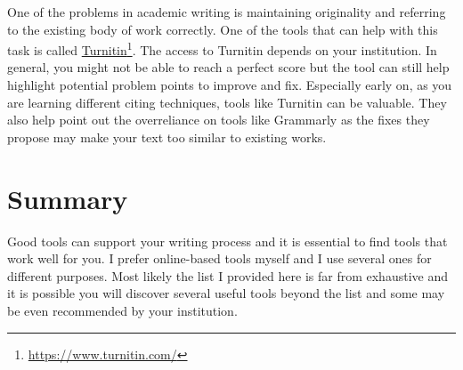 One of the problems in academic writing is maintaining originality and referring to the existing body of work correctly.
One of the tools that can help with this task is called \href{https://www.turnitin.com/}{Turnitin}\footnote{\url{https://www.turnitin.com/}}.
The access to Turnitin depends on your institution. In general, you might not be able to reach a perfect score but the tool can still help highlight potential problem points to improve and fix.
Especially early on, as you are learning different citing techniques, tools like Turnitin can be valuable.
They also help point out the overreliance on tools like Grammarly as the fixes they propose may make your text too similar to existing works.


\section{Summary}

Good tools can support your writing process and it is essential to find tools that work well for you.
I prefer online-based tools myself and I use several ones for different purposes. Most likely the list I provided here is far from exhaustive and it is possible you will discover several useful tools beyond the list and some may be even recommended by your institution.
